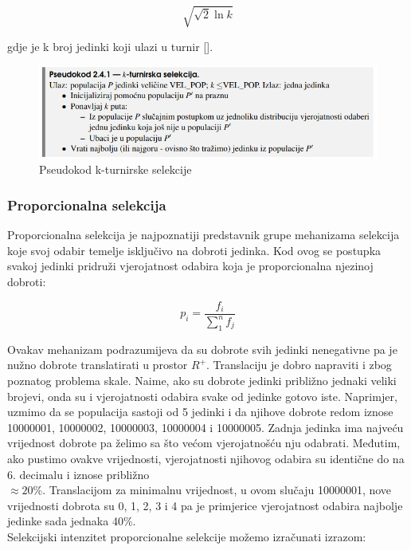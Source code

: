 \documentclass[times, utf8, zavrsni]{fer}
\begin{document}
\begin{equation}
	\sqrt{\sqrt{2} \ln{k}}
\end{equation}

gdje je k broj jedinki koji ulazi u turnir [\citep{Back1995}]. 

\begin{figure}[!htb]
	\centering
	\includegraphics[width=15cm]{slike/kTourSelect.png}
	\caption{Pseudokod k-turnirske selekcije}
	\label{fig:k-tour-select}
\end{figure}


\subsubsection{Proporcionalna selekcija}
Proporcionalna selekcija je najpoznatiji predstavnik grupe mehanizama selekcija koje svoj odabir temelje isključivo na dobroti jedinka. Kod ovog se postupka svakoj jedinki pridruži vjerojatnost odabira koja je proporcionalna njezinoj dobroti:

\begin{equation}
	p_i=\frac{f_i}{\sum_{1}^{n}f_j}
\end{equation}

Ovakav mehanizam podrazumijeva da su dobrote svih jedinki nenegativne pa je nužno dobrote translatirati u prostor $R^+$. Translaciju je dobro napraviti i zbog poznatog problema skale. Naime, ako su dobrote jedinki približno jednaki veliki brojevi, onda su i vjerojatnosti odabira svake od jedinke gotovo iste. Naprimjer,
uzmimo da se populacija sastoji od 5 jedinki i da njihove dobrote redom iznose 10000001, 10000002, 10000003, 10000004 i 10000005. Zadnja jedinka ima najveću vrijednost dobrote pa želimo sa što većom vjerojatnošću nju odabrati. Međutim, ako pustimo ovakve vrijednosti, vjerojatnosti njihovog odabira su identične do na 6. decimalu i iznose približno \\$\approx20\%$.  Translacijom za minimalnu vrijednost, u ovom slučaju 10000001, nove vrijednosti dobrota su 0, 1, 2, 3 i 4 pa je primjerice vjerojatnost odabira najbolje jedinke sada jednaka 40\%. \\
Selekcijski intenzitet proporcionalne selekcije možemo izračunati izrazom:
\end{document}
